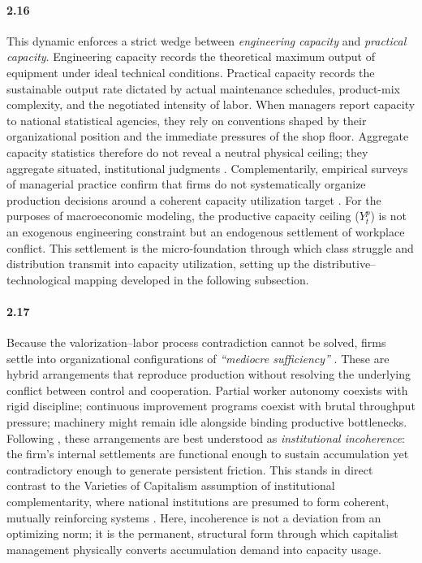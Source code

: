 \paragraph{2.16}
This dynamic enforces a strict wedge between
\textit{engineering capacity} and \textit{practical capacity}.
Engineering capacity records the theoretical maximum output of
equipment under ideal technical conditions. Practical capacity
records the sustainable output rate dictated by actual
maintenance schedules, product-mix complexity, and the negotiated
intensity of labor. When managers report capacity to national
statistical agencies, they rely on conventions shaped by their
organizational position and the immediate pressures of the shop
floor. Aggregate capacity statistics therefore do not reveal a
neutral physical ceiling; they aggregate situated, institutional
judgments \citep{Shaikh2016, Nikiforos2016}. Complementarily,
empirical surveys of managerial practice confirm that firms do
not systematically organize production decisions around a
coherent capacity utilization target \citep{Singh2022}. For the
purposes of macroeconomic modeling, the productive capacity
ceiling ($Y^p_t$) is not an exogenous engineering constraint but
an endogenous settlement of workplace conflict. This settlement
is the micro-foundation through which class struggle and
distribution transmit into capacity utilization, setting up the
distributive--technological mapping developed in the following
subsection.

\paragraph{2.17}
Because the valorization--labor process contradiction cannot be
solved, firms settle into organizational configurations of
\textit{``mediocre sufficiency''} \citep{Vidal2022}. These are hybrid
arrangements that reproduce production without resolving the
underlying conflict between control and cooperation. Partial
worker autonomy coexists with rigid discipline; continuous
improvement programs coexist with brutal throughput pressure;
machinery might remain idle alongside binding productive bottlenecks. Following
\citet{Vidal2014}, these arrangements are best understood as
\textit{institutional incoherence}: the firm's internal
settlements are functional enough to sustain accumulation yet
contradictory enough to generate persistent friction. This stands
in direct contrast to the Varieties of Capitalism assumption of
institutional complementarity, where national institutions are
presumed to form coherent, mutually reinforcing systems \citep{Hall2003}. Here,
incoherence is not a deviation from an optimizing norm; it is the
permanent, structural form through which capitalist management
physically converts accumulation demand into capacity usage. 

